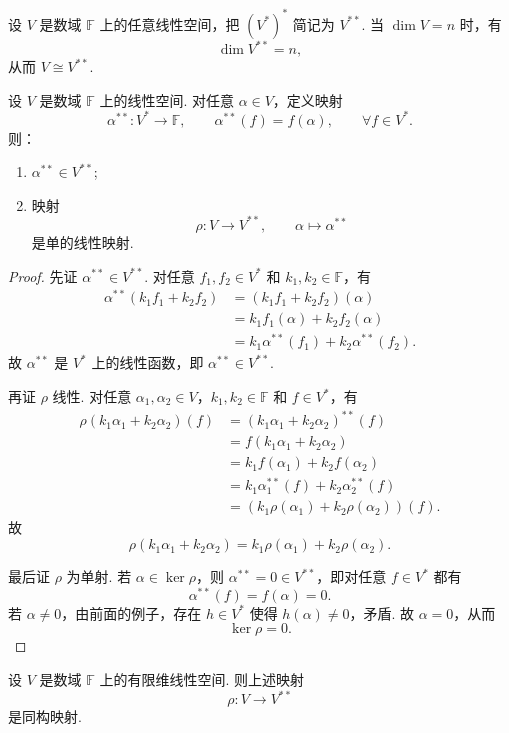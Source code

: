 \label{p1:concept:c7-l250}设 $V$ 是数域 $\mathbb{F}$ 上的任意线性空间，把 $(V^*)^*$ 简记为 $V^{**}$.
当 $\dim V=n$ 时，有
\[
\dim V^{**}=n,
\]
从而 $V\cong V^{**}$.

\begin{lemma}
	设 $V$ 是数域 $\mathbb{F}$ 上的线性空间. 对任意 $\alpha\in V$，定义映射
	\[
	\alpha^{**}:V^*\longrightarrow \mathbb{F},\qquad \alpha^{**}(f)=f(\alpha),\qquad \forall f\in V^*.
	\]
	则：
	\begin{enumerate}
		\item $\alpha^{**}\in V^{**}$;
		\item 映射
		\[
		\rho:V\longrightarrow V^{**},\qquad \alpha\longmapsto \alpha^{**}
		\]
		是单的线性映射.
	\end{enumerate}
\end{lemma}

\begin{proof}
	先证 $\alpha^{**}\in V^{**}$. 对任意 $f_1,f_2\in V^*$ 和 $k_1,k_2\in\mathbb{F}$，有
	\[
	\begin{aligned}
		\alpha^{**}(k_1f_1+k_2f_2)
		&=(k_1f_1+k_2f_2)(\alpha)\\
		&=k_1f_1(\alpha)+k_2f_2(\alpha)\\
		&=k_1\alpha^{**}(f_1)+k_2\alpha^{**}(f_2).
	\end{aligned}
	\]
	故 $\alpha^{**}$ 是 $V^*$ 上的线性函数，即 $\alpha^{**}\in V^{**}$.
	
	再证 $\rho$ 线性. 对任意 $\alpha_1,\alpha_2\in V$，$k_1,k_2\in\mathbb{F}$ 和 $f\in V^*$，有
	\[
	\begin{aligned}
		\rho(k_1\alpha_1+k_2\alpha_2)(f)
		&=(k_1\alpha_1+k_2\alpha_2)^{**}(f)\\
		&=f(k_1\alpha_1+k_2\alpha_2)\\
		&=k_1f(\alpha_1)+k_2f(\alpha_2)\\
		&=k_1\alpha_1^{**}(f)+k_2\alpha_2^{**}(f)\\
		&=(k_1\rho(\alpha_1)+k_2\rho(\alpha_2))(f).
	\end{aligned}
	\]
	故
	\[
	\rho(k_1\alpha_1+k_2\alpha_2)=k_1\rho(\alpha_1)+k_2\rho(\alpha_2).
	\]
	
	最后证 $\rho$ 为单射. 若 $\alpha\in\ker\rho$，则 $\alpha^{**}=0\in V^{**}$，即对任意
	$f\in V^*$ 都有
	\[
	\alpha^{**}(f)=f(\alpha)=0.
	\]
	若 $\alpha\ne0$，由前面的例子，存在 $h\in V^*$ 使得 $h(\alpha)\ne0$，矛盾. 故 $\alpha=0$，从而
	\[
	\ker\rho=0.
	\]
\end{proof}

\begin{theorem}[对偶定理]
	设 $V$ 是数域 $\mathbb{F}$ 上的有限维线性空间. 则上述映射
	\[
	\rho:V\longrightarrow V^{**}
	\]
	是同构映射.
\end{theorem}


